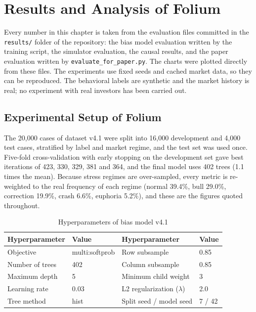 \chapter{Results and Analysis of Folium}
Every number in this chapter is taken from the evaluation files committed in the \texttt{results/} folder of the repository: the bias model evaluation written by the training script, the simulator evaluation, the causal results, and the paper evaluation written by \texttt{evaluate\_for\_paper.py}. The charts were plotted directly from these files. The experiments use fixed seeds and cached market data, so they can be reproduced. The behavioral labels are synthetic and the market history is real; no experiment with real investors has been carried out.

\section{Experimental Setup of Folium}
The 20,000 cases of dataset v4.1 were split into 16,000 development and 4,000 test cases, stratified by label and market regime, and the test set was used once. Five-fold cross-validation with early stopping on the development set gave best iterations of 423, 330, 329, 381 and 364, and the final model uses 402 trees (1.1 times the mean). Because stress regimes are over-sampled, every metric is re-weighted to the real frequency of each regime (normal 39.4\%, bull 29.0\%, correction 19.9\%, crash 6.6\%, euphoria 5.2\%), and these are the figures quoted throughout.

\begin{table}[H]
\centering
\small
\begin{tabular}{|l|l||l|l|}
\hline
\textbf{Hyperparameter} & \textbf{Value} & \textbf{Hyperparameter} & \textbf{Value} \\
\hline
Objective & multi:softprob & Row subsample & 0.85 \\
\hline
Number of trees & 402 & Column subsample & 0.85 \\
\hline
Maximum depth & 5 & Minimum child weight & 3 \\
\hline
Learning rate & 0.03 & L2 regularization ($\lambda$) & 2.0 \\
\hline
Tree method & hist & Split seed / model seed & 7 / 42 \\
\hline
\end{tabular}
\caption{Hyperparameters of bias model v4.1}
\label{tab:hyper}
\end{table}

